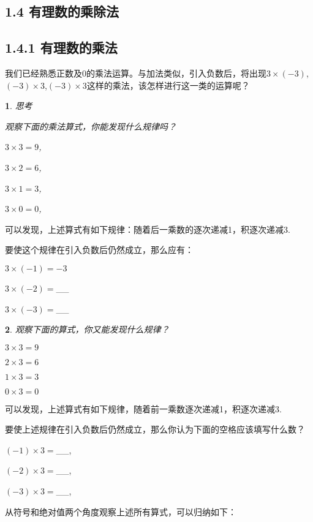 \documentclass{article}
\newtheorem{example}{ }
\begin{document}
\begin{article}

\section*{1.4 有理数的乘除法}

\subsection*{1.4.1 有理数的乘法}

我们已经熟悉正数及0的乘法运算。与加法类似，引入负数后，将出现${3}\times{(-3)}$,
${(-3)}\times{3}$,${(-3)\times{3}}$这样的乘法，该怎样进行这一类的运算呢？

\begin{example}

思考

观察下面的乘法算式，你能发现什么规律吗？

$3\times3=9$,

$3\times2=6$,

$3\times1=3$,

$3\times0=0$,

\end{example}

可以发现，上述算式有如下规律：随着后一乘数的逐次递减1，积逐次递减3.

要使这个规律在引入负数后仍然成立，那么应有：

$3\times(-1)=-3$

$3\times(-2)=$__

$3\times(-3)=$__

\begin{example}

观察下面的算式，你又能发现什么规律？

$3\times3=9$

$2\times3=6$

$1\times3=3$

$0\times3=0$

\end{example}

可以发现，上述算式有如下规律，随着前一乘数逐次递减1，积逐次递减3.

要使上述规律在引入负数后仍然成立，那么你认为下面的空格应该填写什么数？

$(-1)\times3=$__,

$(-2)\times3=$__,

$(-3)\times3=$__,

从符号和绝对值两个角度观察上述所有算式，可以归纳如下：


\end{article}
\end{document}
